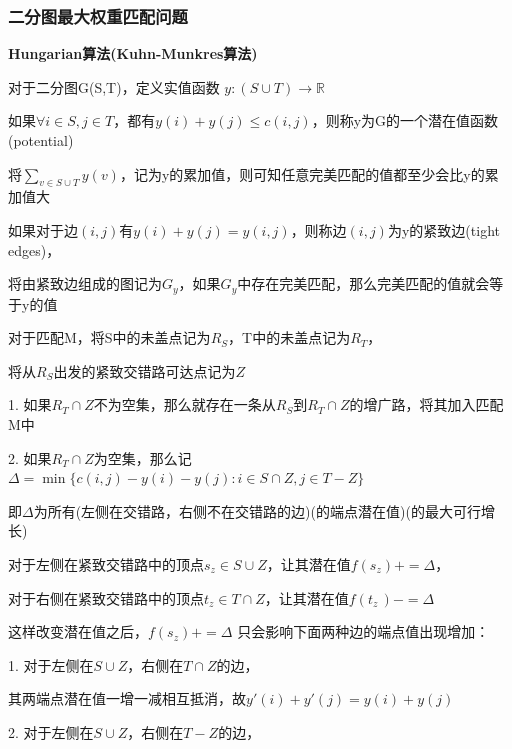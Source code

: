 \documentclass[UTF8]{ctexart}
\begin{document}
\subsubsection{二分图最大权重匹配问题}

\textbf{Hungarian算法(Kuhn-Munkres算法)}\cite{munkres1957algorithms}

对于二分图G(S,T)，定义实值函数 $y:(S\cup T)\to\mathbb{R}$

如果$\forall i\in S,j\in T$，都有$y(i)+y(j)\le c(i,j)$，则称y为G的一个潜在值函数(potential)

将$\sum_{v\in S\cup T}y(v)$，记为y的累加值，则可知任意完美匹配的值都至少会比y的累加值大

如果对于边$(i,j)$有$y(i)+y(j)=y(i,j)$，则称边$(i,j)$为y的紧致边(tight edges)，

将由紧致边组成的图记为$G_y$，如果$G_y$中存在完美匹配，那么完美匹配的值就会等于y的值

\vspace{5cm}

对于匹配M，将S中的未盖点记为$R_S$，T中的未盖点记为$R_T$，

将从$R_S$出发的紧致交错路可达点记为$Z$

\vspace{0.5cm}

1. 如果$R_T\cap Z$不为空集，那么就存在一条从$R_S$到$R_T\cap Z$的增广路，将其加入匹配M中

2. 如果$R_T\cap Z$为空集，那么记$\Delta=\min\{c(i,j)-y(i)-y(j):i\in S\cap Z,j\in T-Z\}$

\vspace{0.5cm}

即$\Delta$为所有(左侧在交错路，右侧不在交错路的边)(的端点潜在值)(的最大可行增长)

对于左侧在紧致交错路中的顶点$s_z\in S\cup Z$，让其潜在值$f(s_z)+=\Delta$，

对于右侧在紧致交错路中的顶点$t_z\in T\cap Z$，让其潜在值$f(t_z\,)-=\Delta$

这样改变潜在值之后，$f(s_z)+=\Delta$ 只会影响下面两种边的端点值出现增加：

\vspace{0.2cm}

1. 对于左侧在$S\cup Z$，右侧在$T\cap Z$的边，

其两端点潜在值一增一减相互抵消，故$y'(i)+y'(j)=y(i)+y(j)$

\vspace{0.1cm}

2. 对于左侧在$S\cup Z$，右侧在$T-Z$的边，
\end{document}

